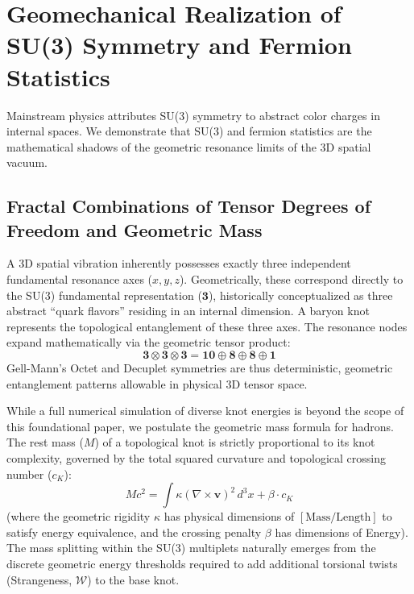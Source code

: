 \documentclass[reprint,amsmath,amssymb,aps,prd]{revtex4-2}
\begin{document}
\section{Geomechanical Realization of SU(3) Symmetry and Fermion Statistics}

Mainstream physics attributes SU(3) symmetry to abstract color charges in internal spaces. We demonstrate that SU(3) and fermion statistics are the mathematical shadows of the geometric resonance limits of the 3D spatial vacuum.

\subsection{Fractal Combinations of Tensor Degrees of Freedom and Geometric Mass}
A 3D spatial vibration inherently possesses exactly three independent fundamental resonance axes ($x, y, z$). Geometrically, these correspond directly to the SU(3) fundamental representation ($\mathbf{3}$), historically conceptualized as three abstract ``quark flavors'' residing in an internal dimension. A baryon knot represents the topological entanglement of these three axes. The resonance nodes expand mathematically via the geometric tensor product:
\begin{equation}
\mathbf{3} \otimes \mathbf{3} \otimes \mathbf{3} = \mathbf{10} \oplus \mathbf{8} \oplus \mathbf{8} \oplus \mathbf{1}
\end{equation}
Gell-Mann's Octet and Decuplet symmetries \cite{GellMann1964} are thus deterministic, geometric entanglement patterns allowable in physical 3D tensor space.

While a full numerical simulation of diverse knot energies is beyond the scope of this foundational paper, we postulate the geometric mass formula for hadrons. The rest mass ($M$) of a topological knot is strictly proportional to its knot complexity, governed by the total squared curvature and topological crossing number ($c_K$):
\begin{equation}
M c^2 = \int \kappa (\nabla \times \mathbf{v})^2 \, d^3x + \beta \cdot c_K
\end{equation}
(where the geometric rigidity $\kappa$ has physical dimensions of $[\mathrm{Mass}/\mathrm{Length}]$ to satisfy energy equivalence, and the crossing penalty $\beta$ has dimensions of Energy). The mass splitting within the SU(3) multiplets naturally emerges from the discrete geometric energy thresholds required to add additional torsional twists (Strangeness, $\mathcal{W}$) to the base knot.
\end{document}
